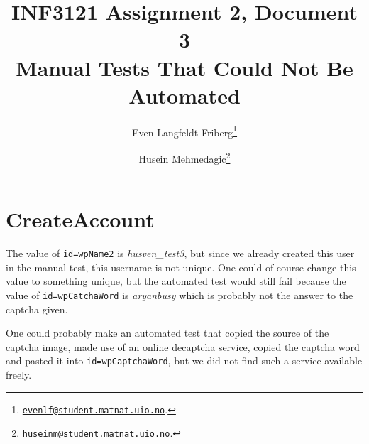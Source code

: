 \documentclass[a4paper,10pt]{article}
\title{INF3121 Assignment 2, Document 3 \\ Manual Tests That Could Not Be Automated}
\author{
Even Langfeldt Friberg\footnote{\href{mailto:evenlf@student.matnat.uio.no}{\nolinkurl{evenlf@student.matnat.uio.no}}.}
\and Husein Mehmedagic\footnote{\href{mailto:huseinm@student.matnat.uio.no}{\nolinkurl{huseinm@student.matnat.uio.no}}.}
}
\begin{document}
\maketitle

\section{CreateAccount}
The value of \texttt{id=wpName2} is \textit{husven\_test3}, but since we already created this user in the manual test, this username is not unique. One could of course 
change this value to something unique, but the automated test would still fail because the value of \texttt{id=wpCatchaWord} is \textit{aryanbusy} which is probably not 
the answer to the captcha given.

One could probably make an automated test that copied the source of the captcha image, made use of an online decaptcha service, copied the captcha word 
and pasted it into \texttt{id=wpCaptchaWord}, but we did not find such a service available freely.
\end{document}
